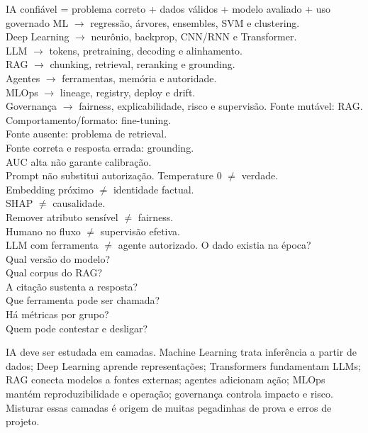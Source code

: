 {IA confiável = problema correto + dados válidos + modelo avaliado + uso governado}
{ML $\rightarrow$ regressão, árvores, ensembles, SVM e clustering.\\Deep Learning $\rightarrow$ neurônio, backprop, CNN/RNN e Transformer.\\LLM $\rightarrow$ tokens, pretraining, decoding e alinhamento.\\RAG $\rightarrow$ chunking, retrieval, reranking e grounding.\\Agentes $\rightarrow$ ferramentas, memória e autoridade.\\MLOps $\rightarrow$ lineage, registry, deploy e drift.\\Governança $\rightarrow$ fairness, explicabilidade, risco e supervisão.}
{Fonte mutável: RAG.\\Comportamento/formato: fine-tuning.\\Fonte ausente: problema de retrieval.\\Fonte correta e resposta errada: grounding.\\AUC alta não garante calibração.\\Prompt não substitui autorização.}
{Temperature 0 $\neq$ verdade.\\Embedding próximo $\neq$ identidade factual.\\SHAP $\neq$ causalidade.\\Remover atributo sensível $\neq$ fairness.\\Humano no fluxo $\neq$ supervisão efetiva.\\LLM com ferramenta $\neq$ agente autorizado.}
{O dado existia na época?\\Qual versão do modelo?\\Qual corpus do RAG?\\A citação sustenta a resposta?\\Que ferramenta pode ser chamada?\\Há métricas por grupo?\\Quem pode contestar e desligar?}

\begin{resumo}
IA deve ser estudada em camadas. Machine Learning trata inferência a partir de dados; Deep Learning aprende representações; Transformers fundamentam LLMs; RAG conecta modelos a fontes externas; agentes adicionam ação; MLOps mantém reproduzibilidade e operação; governança controla impacto e risco. Misturar essas camadas é origem de muitas pegadinhas de prova e erros de projeto.
\end{resumo}
